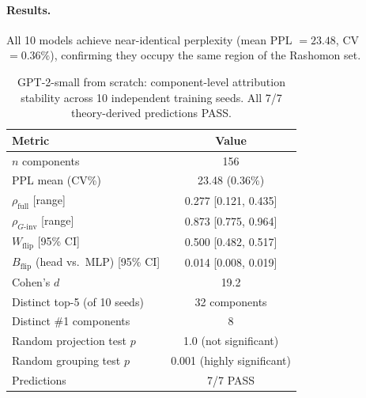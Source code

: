 \documentclass{article}
\begin{document}
\paragraph{Results.}
All 10 models achieve near-identical perplexity (mean PPL $= 23.48$, CV $= 0.36\%$), confirming they occupy the same region of the Rashomon set.

\begin{table}[ht]
\centering
\caption{GPT-2-small from scratch: component-level attribution stability across 10 independent training seeds. All 7/7 theory-derived predictions PASS.}
\label{tab:gpt2-from-scratch}
\small
\begin{tabular}{lc}
\toprule
\textbf{Metric} & \textbf{Value} \\
\midrule
$n$ components & 156 \\
PPL mean (CV\%) & 23.48 (0.36\%) \\
\midrule
$\rho_{\text{full}}$ [range] & 0.277 [0.121, 0.435] \\
$\rho_{G\text{-inv}}$ [range] & 0.873 [0.775, 0.964] \\
\midrule
$W_{\text{flip}}$ [95\% CI] & 0.500 [0.482, 0.517] \\
$B_{\text{flip}}$ (head vs.\ MLP) [95\% CI] & 0.014 [0.008, 0.019] \\
Cohen's $d$ & 19.2 \\
\midrule
Distinct top-5 (of 10 seeds) & 32 components \\
Distinct \#1 components & 8 \\
\midrule
Random projection test $p$ & 1.0 (not significant) \\
Random grouping test $p$ & 0.001 (highly significant) \\
\midrule
Predictions & 7/7 PASS \\
\bottomrule
\end{tabular}
\end{table}
\end{document}

